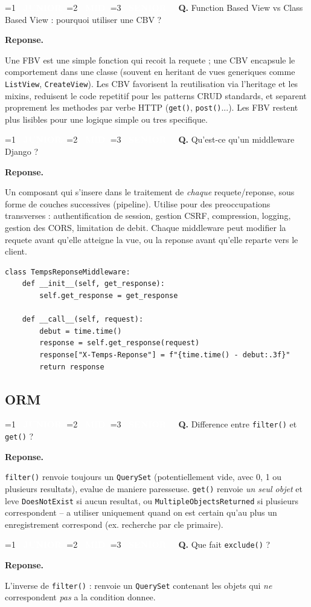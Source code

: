 \documentclass[11pt,a4paper]{article}
\newcommand{\badgeJ}{\textcolor{white}{\colorbox{junior}{\small\bfseries\ JUNIOR\ }}}
\newcommand{\badgeM}{\textcolor{white}{\colorbox{mid}{\small\bfseries\ MID\ }}}
\newcommand{\badgeS}{\textcolor{white}{\colorbox{senior}{\small\bfseries\ SENIOR\ }}}
\newcounter{qcount}
\newenvironment{qa}[2]{%
  \stepcounter{qcount}%
  \par\vspace{6pt}%
  \noindent\colorbox{qbg}{\parbox{\dimexpr\linewidth-12pt}{\vspace{2pt}%
  \ifnum#1=1 \badgeJ\fi\ifnum#1=2 \badgeM\fi\ifnum#1=3 \badgeS\fi
  \ \textbf{Q\theqcount.} #2\vspace{2pt}}}\par\vspace{4pt}%
  \noindent\textbf{\color{accent}Reponse.}\ \ignorespaces
}{%
  \par\vspace{8pt}%
}
\begin{document}
\begin{qa}{1}{Function Based View vs Class Based View : pourquoi utiliser une CBV ?}
Une FBV est une simple fonction qui recoit la requete ; une CBV encapsule le
comportement dans une classe (souvent en heritant de vues generiques comme
\texttt{ListView}, \texttt{CreateView}). Les CBV favorisent la reutilisation
via l'heritage et les mixins, reduisent le code repetitif pour les patterns
CRUD standards, et separent proprement les methodes par verbe HTTP
(\texttt{get()}, \texttt{post()}...). Les FBV restent plus lisibles pour une
logique simple ou tres specifique.
\end{qa}

\begin{qa}{2}{Qu'est-ce qu'un middleware Django ?}
Un composant qui s'insere dans le traitement de \emph{chaque} requete/reponse,
sous forme de couches successives (pipeline). Utilise pour des
preoccupations transverses : authentification de session, gestion CSRF,
compression, logging, gestion des CORS, limitation de debit. Chaque
middleware peut modifier la requete avant qu'elle atteigne la vue, ou la
reponse avant qu'elle reparte vers le client.
\begin{lstlisting}
class TempsReponseMiddleware:
    def __init__(self, get_response):
        self.get_response = get_response

    def __call__(self, request):
        debut = time.time()
        response = self.get_response(request)
        response["X-Temps-Reponse"] = f"{time.time() - debut:.3f}"
        return response
\end{lstlisting}
\end{qa}

\subsection{ORM}

\begin{qa}{1}{Difference entre \texttt{filter()} et \texttt{get()} ?}
\texttt{filter()} renvoie toujours un \texttt{QuerySet} (potentiellement
vide, avec 0, 1 ou plusieurs resultats), evalue de maniere paresseuse.
\texttt{get()} renvoie \emph{un seul objet} et leve
\texttt{DoesNotExist} si aucun resultat, ou
\texttt{MultipleObjectsReturned} si plusieurs correspondent -- a utiliser
uniquement quand on est certain qu'au plus un enregistrement correspond (ex.
recherche par cle primaire).
\end{qa}

\begin{qa}{1}{Que fait \texttt{exclude()} ?}
L'inverse de \texttt{filter()} : renvoie un \texttt{QuerySet} contenant les
objets qui \emph{ne} correspondent \emph{pas} a la condition donnee.
\end{qa}
\end{document}
